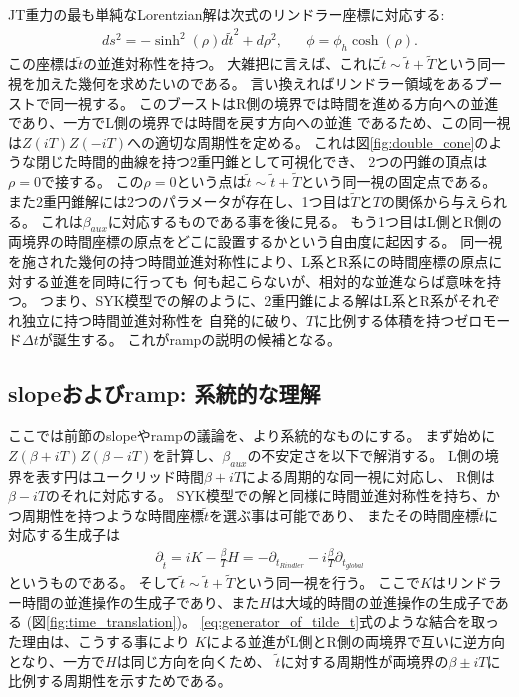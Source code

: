JT重力の最も単純なLorentzian解は次式のリンドラー座標に対応する:
\begin{align}
	ds^2 = -\sinh^2(\rho)d\tilde{t}^2 + d\rho^2,\hspace{20pt}
	\phi = \phi_h\cosh(\rho).
	\label{eq:Rindler_coordinate}
\end{align}
この座標は$\tilde{t}$の並進対称性を持つ。
大雑把に言えば、これに$\tilde{t}\sim\tilde{t}+\tilde{T}$という同一視を加えた幾何を求めたいのである。
言い換えればリンドラー領域をあるブーストで同一視する。
このブーストはR側の境界では時間を進める方向への並進であり、一方でL側の境界では時間を戻す方向への並進
であるため、この同一視は$Z(iT)Z(-iT)$への適切な周期性を定める。
これは図\ref{fig:double_cone}のような閉じた時間的曲線を持つ2重円錐として可視化でき、
2つの円錐の頂点は$\rho = 0$で接する。
この$\rho = 0$という点は$\tilde{t}\sim\tilde{t}+\tilde{T}$という同一視の固定点である。
また2重円錐解には2つのパラメータが存在し、1つ目は$\tilde{T}$と$T$の関係から与えられる。
これは$\beta_{aux}$に対応するものである事を後に見る。
もう1つ目はL側とR側の両境界の時間座標の原点をどこに設置するかという自由度に起因する。
同一視を施された幾何の持つ時間並進対称性により、L系とR系にの時間座標の原点に対する並進を同時に行っても
何も起こらないが、相対的な並進ならば意味を持つ。
つまり、SYK模型での解のように、2重円錐による解はL系とR系がそれぞれ独立に持つ時間並進対称性を
自発的に破り、$T$に比例する体積を持つゼロモード$\Delta t$が誕生する。
これがrampの説明の候補となる。

\subsection{slopeおよびramp: 系統的な理解}
ここでは前節のslopeやrampの議論を、より系統的なものにする。
まず始めに$Z(\beta + iT)Z(\beta - iT)$を計算し、$\beta_{aux}$の不安定さを以下で解消する。
L側の境界を表す円はユークリッド時間$\beta + iT$による周期的な同一視に対応し、
R側は$\beta - iT$のそれに対応する。
SYK模型での解と同様に時間並進対称性を持ち、かつ周期性を持つような時間座標$\tilde{t}$を選ぶ事は可能であり、
またその時間座標$\tilde{t}$に対応する生成子は
\begin{align}
	\partial_{\tilde{t}}
	= iK - \frac{\beta}{T}H
	= -\partial_{t_{Rindler}} - i\frac{\beta}{T}\partial_{t_{global}}
	\label{eq:generator_of_tilde_t}
\end{align}
というものである。
そして$\tilde{t}\sim\tilde{t} + \tilde{T}$という同一視を行う。
ここで$K$はリンドラー時間の並進操作の生成子であり、また$H$は大域的時間の並進操作の生成子である
(図\ref{fig:time_translation})。
\eqref{eq:generator_of_tilde_t}式のような結合を取った理由は、こうする事により
$K$による並進がL側とR側の両境界で互いに逆方向となり、一方で$H$は同じ方向を向くため、
$\tilde{t}$に対する周期性が両境界の$\beta \pm iT$に比例する周期性を示すためである。

